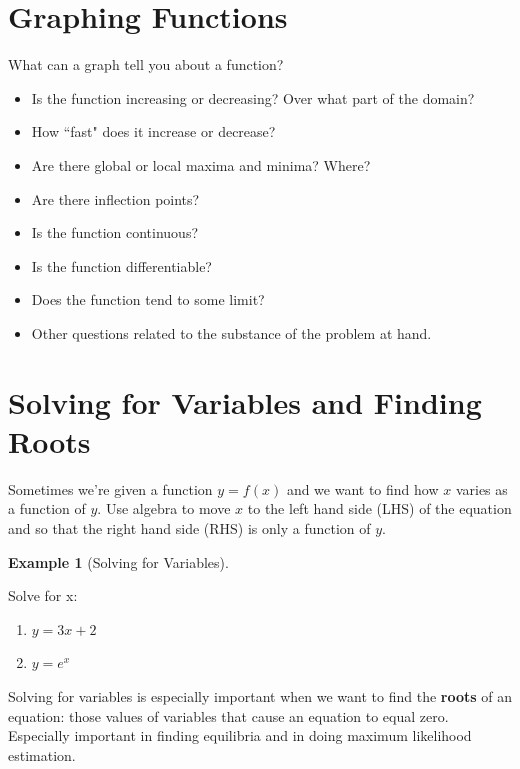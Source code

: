 \documentclass[
]{book}
\providecommand{\tightlist}{%
  \setlength{\itemsep}{0pt}\setlength{\parskip}{0pt}}
\theoremstyle{definition}
\theoremstyle{definition}
\newtheorem{example}{Example}[chapter]
\theoremstyle{definition}
\theoremstyle{remark}
\begin{document}
\hypertarget{graphing-functions}{%
\section{Graphing Functions}\label{graphing-functions}}

What can a graph tell you about a function?

\begin{itemize}
\tightlist
\item
  Is the function increasing or decreasing? Over what part of the domain?
\item
  How ``fast" does it increase or decrease?
\item
  Are there global or local maxima and minima? Where?
\item
  Are there inflection points?
\item
  Is the function continuous?
\item
  Is the function differentiable?
\item
  Does the function tend to some limit?
\item
  Other questions related to the substance of the problem at hand.
\end{itemize}

\hypertarget{solving-for-variables-and-finding-roots}{%
\section{Solving for Variables and Finding Roots}\label{solving-for-variables-and-finding-roots}}

Sometimes we're given a function \(y=f(x)\) and we want to find how \(x\) varies as a function of \(y\). Use algebra to move \(x\) to the left hand side (LHS) of the equation and so that the right hand side (RHS) is only a function of \(y\).

\begin{example}[Solving for Variables]
\protect\hypertarget{exm:solvevar}{}{\label{exm:solvevar} {} }

Solve for x:

\begin{enumerate}
\def\labelenumi{\arabic{enumi}.}
\item
  \(y=3x+2\)
\item
  \(y=e^x\)
\end{enumerate}
\end{example}

Solving for variables is especially important when we want to find the \textbf{roots} of an equation: those values of variables that cause an equation to equal zero. Especially important in finding equilibria and in doing maximum likelihood estimation.
\end{document}
